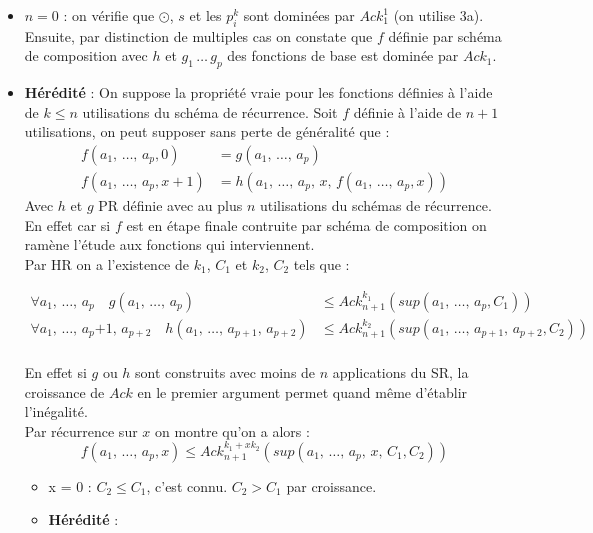 \documentclass[12pt,letterpaper,boxed]{hmcpset}
\begin{document}
\begin{solution}
\begin{solution}[(d)]
\begin{itemize}

\item $n = 0$ : on vérifie que $\odot$, $s$ et les $p_{i}^{k}$ sont dominées par $Ack^{1}_{1}$ (on utilise 3a). \\
Ensuite, par distinction de multiples cas on constate que $f$ définie par schéma de composition avec $h$ et $g_{1}
 \, \dots \,g_{p}$ des fonctions de base est dominée par $Ack_{1}$.
 
 \item \textbf{Hérédité} : On suppose la propriété vraie pour les fonctions définies à l'aide de $k \leq n$ utilisations du schéma de récurrence.
Soit $f$ définie à l'aide de $n+1$ utilisations, on peut supposer sans perte de généralité que : 
\begin{align*}
f(a_{1}, \, \dots , \, a_{p}, 0) & = g(a_{1}, \, \dots , \, a_{p}) \\
f(a_{1}, \, \dots , \, a_{p}, x+1) & = h(a_{1}, \, \dots , \, a_{p}, \, x , \,  f(a_{1}, \, \dots , \, a_{p}, x))
\end{align*}
Avec $h$ et $g$ PR définie avec au plus $n$ utilisations du schémas de récurrence.
En effet car si $f$ est en étape finale contruite par schéma de composition on ramène l'étude aux fonctions qui interviennent. \\

Par HR on a l'existence de $k_{1}$, $C_{1}$ et $k_{2}$, $C_{2}$ tels que :

\begin{align*}
\forall a_{1}, \, \dots , \, a_{p} \quad g(a_{1}, \, \dots , \, a_{p}) & \leq  Ack^{k_{1}}_{n+1}(sup(a_{1}, \, \dots , \, a_{p}, C_{1}))\\
\forall a_{1}, \, \dots , \, a_p{+1}, \, a_{p+2} \quad  h(a_{1}, \, \dots , \, a_{p+1}, \, a_{p+2}) & \leq  Ack^{k_{2}}_{n+1}(sup(a_{1}, \, \dots , \, a_{p+1}, \, a_{p+2}, C_{2}))\\
\end{align*}

En effet si $g$ ou $h$ sont construits avec moins de $n$ applications du SR, la croissance de $Ack$ en le premier argument permet quand même d'établir l'inégalité. \\
Par récurrence sur $x$ on montre qu'on a alors :
$$ f(a_{1}, \, \dots , \, a_{p}, x) \leq Ack^{k_{1} + xk_{2}}_{n+1}(sup(a_{1}, \, \dots , \, a_{p}, \, x, \,  C_{1}, C_{2}))  $$

	\begin{itemize}[leftmargin=*]
		\item x = 0 : $C_{2} \leq C_{1}$, c'est connu. $C_{2} > C_{1}$ par croissance.
		\item \textbf{Hérédité} :
		

\end{itemize}
\end{itemize}
\end{solution}
\end{solution}
\end{document}
